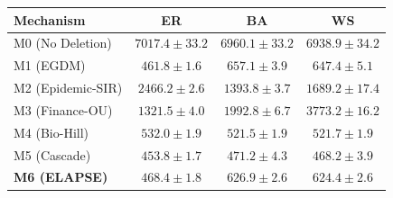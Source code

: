 \begin{tabular}{lccc}
  \toprule
  Mechanism & ER & BA & WS \\
  \midrule
  M0 (No Deletion) & $7017.4 \pm 33.2$ & $6960.1 \pm 33.2$ & $6938.9 \pm 34.2$ \\
  M1 (EGDM) & $461.8 \pm 1.6$ & $657.1 \pm 3.9$ & $647.4 \pm 5.1$ \\
  M2 (Epidemic-SIR) & $2466.2 \pm 2.6$ & $1393.8 \pm 3.7$ & $1689.2 \pm 17.4$ \\
  M3 (Finance-OU) & $1321.5 \pm 4.0$ & $1992.8 \pm 6.7$ & $3773.2 \pm 16.2$ \\
  M4 (Bio-Hill) & $532.0 \pm 1.9$ & $521.5 \pm 1.9$ & $521.7 \pm 1.9$ \\
  M5 (Cascade) & $453.8 \pm 1.7$ & $471.2 \pm 4.3$ & $468.2 \pm 3.9$ \\
  \midrule
  \textbf{M6 (ELAPSE)} & \textbf{$468.4 \pm 1.8$} & \textbf{$626.9 \pm 2.6$} & \textbf{$624.4 \pm 2.6$} \\
  \bottomrule
\end{tabular}